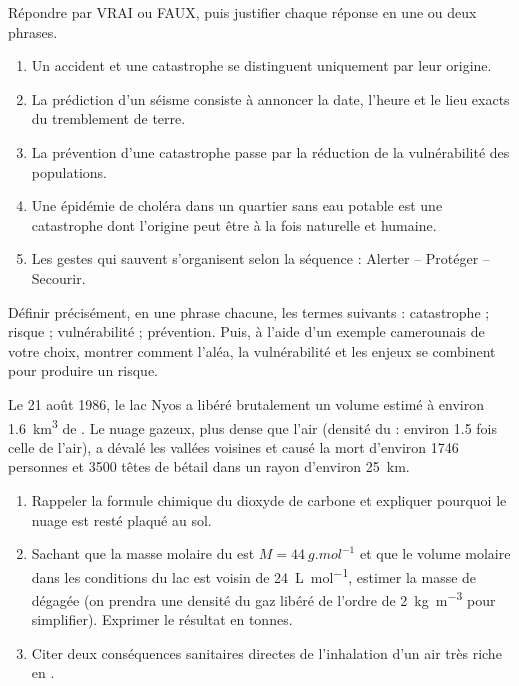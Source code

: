 \documentclass[11pt]{article}
\newcommand{\cle}[1]{{\popxbold\color{popdark}#1}}
\begin{document}
\begin{exercice}
Répondre par VRAI ou FAUX, puis justifier chaque réponse en une ou deux phrases.
\begin{enumerate}
\item Un accident et une catastrophe se distinguent uniquement par leur origine.
\item La prédiction d'un séisme consiste à annoncer la date, l'heure et le lieu exacts du tremblement de terre.
\item La prévention d'une catastrophe passe par la réduction de la vulnérabilité des populations.
\item Une épidémie de choléra dans un quartier sans eau potable est une catastrophe dont l'origine peut être à la fois naturelle et humaine.
\item Les gestes qui sauvent s'organisent selon la séquence : Alerter -- Protéger -- Secourir.
\end{enumerate}
\end{exercice}

\begin{exercice}[Définitions]
Définir précisément, en une phrase chacune, les termes suivants : \cle{catastrophe} ; \cle{risque} ; \cle{vulnérabilité} ; \cle{prévention}. Puis, à l'aide d'un exemple camerounais de votre choix, montrer comment l'aléa, la vulnérabilité et les enjeux se combinent pour produire un risque.
\end{exercice}

\begin{exercice}
Le 21 août 1986, le lac Nyos a libéré brutalement un volume estimé à environ \SI{1,6}{\kilo\metre\cubed} de . Le nuage gazeux, plus dense que l'air (densité du  : environ \num{1,5} fois celle de l'air), a dévalé les vallées voisines et causé la mort d'environ \num{1746} personnes et \num{3500} têtes de bétail dans un rayon d'environ \SI{25}{km}.
\begin{enumerate}
\item Rappeler la formule chimique du dioxyde de carbone et expliquer pourquoi le nuage est resté plaqué au sol.
\item Sachant que la masse molaire du  est $M = \SI{44}{g.mol^{-1}}$ et que le volume molaire dans les conditions du lac est voisin de \SI{24}{L.mol^{-1}}, estimer la masse de  dégagée (on prendra une densité du gaz libéré de l'ordre de \SI{2}{kg.m^{-3}} pour simplifier). Exprimer le résultat en tonnes.
\item Citer deux conséquences sanitaires directes de l'inhalation d'un air très riche en .
\end{enumerate}
\end{exercice}
\end{document}
